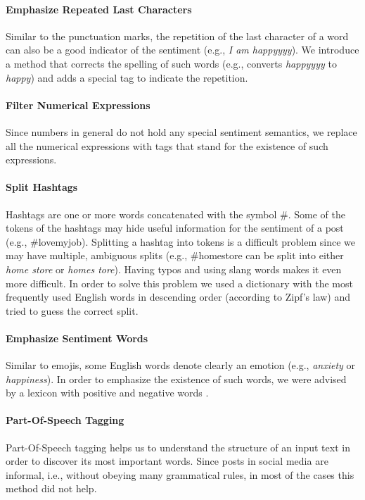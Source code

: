 \paragraph{\textbf{Emphasize Repeated Last Characters}}
{\setlength{\parindent}{0cm}
Similar to the punctuation marks, the repetition of the last character of a word can also be a good indicator of the sentiment (e.g., \textit{I am happyyyy}). We introduce a method that corrects the spelling of such words (e.g., converts \textit{happyyyy} to \textit{happy}) and adds a special tag to indicate the repetition.}

\paragraph{\textbf{Filter Numerical Expressions}}
{\setlength{\parindent}{0cm}
Since numbers in general do not hold any special sentiment semantics,  
we replace all the numerical expressions with tags that stand for the existence of such expressions.}

\paragraph{\textbf{Split Hashtags}}
{\setlength{\parindent}{0cm}
Hashtags are one or more words concatenated with the symbol \#.
Some of the tokens of the hashtags may hide useful information for the sentiment of a post (e.g., \#lovemyjob).
Splitting a hashtag into tokens is a difficult problem \cite{Khaitan:2009:DCS:1645953.1645982} since we may have multiple, ambiguous splits (e.g., \#homestore can be split into either \textit{home store} or \textit{homes tore}). 
Having typos and using slang words makes it even more difficult.
In order to solve this problem we used a dictionary with the most frequently used English words in descending order (according to Zipf's law) and tried to guess the correct split.}


\paragraph{\textbf{Emphasize Sentiment Words}}
{\setlength{\parindent}{0cm}
Similar to emojis, some English words denote clearly an emotion (e.g., \textit{anxiety} or \textit{happiness}). 
In order to emphasize the existence of such words, we were advised by a lexicon with positive and negative words \cite{hu2004mining}.}


\paragraph{\textbf{Part-Of-Speech Tagging}}
{\setlength{\parindent}{0cm}
Part-Of-Speech tagging helps us to understand the structure of an input text in order to discover its most important words.
Since posts in social media are informal, i.e., without obeying many grammatical rules, in most of the cases this method did not help.}

